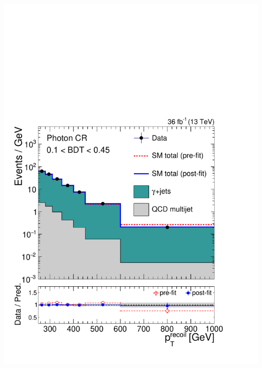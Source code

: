 \documentclass[aspectratio=169,xcolor=dvipsnames,,table,compress]{beamer}
\begin{document}
\begin{frame}[t]
\begin{columns}[T]
\begin{column}{0.125\textwidth}
      \includegraphics[width=\textwidth]{../figures/monotop/postfit/stackedPostfit_photon_monotop_loose.pdf}
    \end{column}
  \end{columns}
\end{frame}
\end{document}
